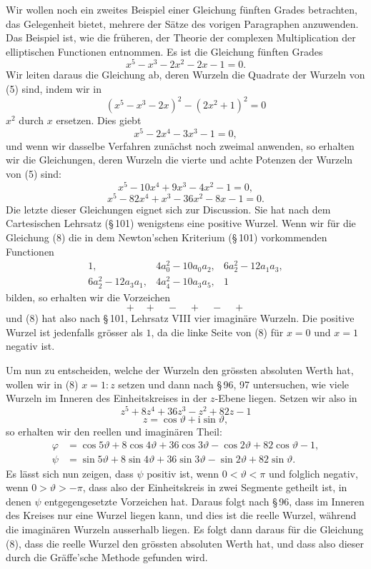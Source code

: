 \documentclass[11pt]{article}
\providecommand{\ii}{\mathrm{i}}
\begin{document}
Wir wollen noch ein zweites Beispiel einer Gleichung fünften Grades betrachten, das Gelegenheit bietet, mehrere der Sätze des vorigen Paragraphen anzuwenden. Das Beispiel ist, wie die früheren, der Theorie der complexen Multiplication der elliptischen Functionen entnommen. Es ist die Gleichung fünften Grades
\begin{equation}
        x^5-x^3-2x^2-2x-1=0.
\tag{5}
\end{equation}
Wir leiten daraus die Gleichung ab, deren Wurzeln die Quadrate der Wurzeln von (5) sind, indem wir in
\[
        (x^5-x^3-2x)^2-(2x^2+1)^2=0
\]
$x^2$ durch $x$ ersetzen. Dies giebt
\begin{equation}
        x^5-2x^4-3x^3-1=0,
\tag{6}
\end{equation}
und wenn wir dasselbe Verfahren zunächst noch zweimal anwenden, so erhalten wir die Gleichungen, deren Wurzeln die vierte und achte Potenzen der Wurzeln von (5) sind:
\begin{equation}
        x^5-10x^4+9x^3-4x^2-1=0,
\tag{7}
\end{equation}
\begin{equation}
        x^5-82x^4+x^3-36x^2-8x-1=0.
\tag{8}
\end{equation}
Die letzte dieser Gleichungen eignet sich zur Discussion. Sie hat nach dem Cartesischen Lehrsatz (\S\,101) wenigstens eine positive Wurzel. Wenn wir für die Gleichung (8) die in dem Newton'schen Kriterium (\S\,101) vorkommenden Functionen
\[
\begin{array}{cccccc}
1,&4a_0^2-10a_0a_2,&6a_2^2-12a_1a_3,\\
6a_2^2-12a_3a_1,&4a_4^2-10a_3a_5,&1
\end{array}
\]
bilden, so erhalten wir die Vorzeichen
\[
        +\quad+\quad-\quad+\quad-\quad+
\]
und (8) hat also nach \S\,101, Lehrsatz VIII vier imaginäre Wurzeln. Die positive Wurzel ist jedenfalls grösser als $1$, da die linke Seite von (8) für $x=0$ und $x=1$ negativ ist.

Um nun zu entscheiden, welche der Wurzeln den grössten absoluten Werth hat, wollen wir in (8) $x=1:z$ setzen und dann nach \S\,96, 97 untersuchen, wie viele Wurzeln im Inneren des Einheitskreises in der $z$-Ebene liegen. Setzen wir also in
\[
        z^5+8z^4+36z^3-z^2+82z-1
\]
\[
        z=\cos\vartheta+\ii\sin\vartheta,
\]
so erhalten wir den reellen und imaginären Theil:
\[
\begin{aligned}
\varphi&=\cos5\vartheta+8\cos4\vartheta+36\cos3\vartheta
        -\cos2\vartheta+82\cos\vartheta-1,\\
\psi&=\sin5\vartheta+8\sin4\vartheta+36\sin3\vartheta
        -\sin2\vartheta+82\sin\vartheta.
\end{aligned}
\]
Es lässt sich nun zeigen, dass $\psi$ positiv ist, wenn $0<\vartheta<\pi$ und folglich negativ, wenn $0>\vartheta>-\pi$, dass also der Einheitskreis in zwei Segmente getheilt ist, in denen $\psi$ entgegengesetzte Vorzeichen hat. Daraus folgt nach \S\,96, dass im Inneren des Kreises nur eine Wurzel liegen kann, und dies ist die reelle Wurzel, während die imaginären Wurzeln ausserhalb liegen. Es folgt dann daraus für die Gleichung (8), dass die reelle Wurzel den grössten absoluten Werth hat, und dass also dieser durch die Gräffe'sche Methode gefunden wird.
\end{document}
